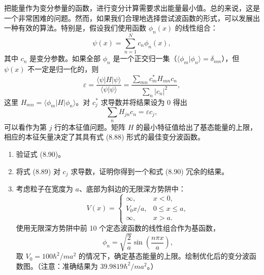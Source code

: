 \begin{question}
把能量作为变分参量的函数，进行变分计算需要求出能量最小值。总的来说，这是一个非常困难的问题。然而，如果我们合理地选择尝试波函数的形式，可以发展出一种有效的算法。特别是，假设我们使用函数 $\phi_n(x)$ 的线性组合：
\[
\psi(x)=\sum_{n=1}^N c_n\phi_n(x),
\]
其中 $c_n$ 是变分参数。如果全部 $\phi_n$ 是一个正交归一集（$\langle\phi_m|\phi_n\rangle=\delta_{mn}$），但 $\psi(x)$ 不一定是归一化的，则
\[
\varepsilon=\frac{\langle\psi|H|\psi\rangle}{\langle\psi|\psi\rangle}=
\frac{\sum_{mn}c_m^*H_{mn}c_n}{\sum_n |c_n|^2},
\]
这里 $H_{mn}=\langle\phi_m|H|\phi_n\rangle$。对 $c_j^*$ 求导数并将结果设为 0 得出
\[
\sum_n H_{jn}c_n=\varepsilon c_j,
\]
可以看作为第 $j$ 行的本征值问题。矩阵 $H$ 的最小特征值给出了基态能量的上限，相应的本征矢量决定了其具有式 (8.88) 形式的最佳变分波函数。
\begin{enumerate}
\item 验证式 (8.90)。
\item 将式 (8.89) 对 $c_j$ 求导数，证明你得到一个和式 (8.90) 冗余的结果。
\item 考虑粒子在宽度为 $a$、底部为斜边的无限深方势阱中：
\[
V(x)=\begin{cases}
\infty, & x<0,\\
V_0x/a, & 0\le x\le a,\\
\infty, & x>a.
\end{cases}
\]
使用无限深方势阱中前 10 个定态波函数的线性组合作为基函数，
\[
\phi_n=\sqrt{\frac2a}\sin\left(\frac{n\pi x}{a}\right),
\]
取 $V_0=100\hbar^2/ma^2$ 的情况下，确定基态能量的上限。绘制优化后的变分波函数图。（注意：准确结果为 $39.9819\hbar^2/ma^2$。）
\end{enumerate}

\par\smallskip
{}

\end{question}
